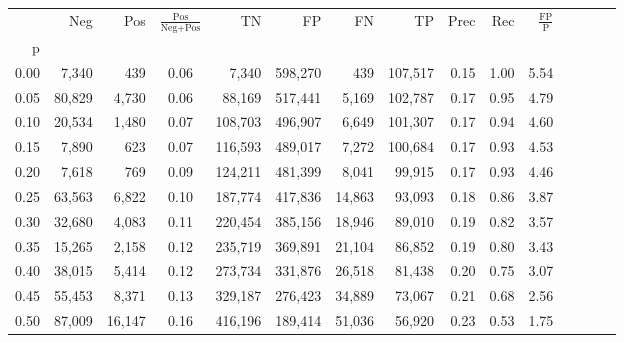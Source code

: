 \begin{tabular}{rrrcrrrrrrrrrrr}
\toprule
{} &     Neg &     Pos & $\frac{\text{Pos}}{\text{Neg}+\text{Pos}}$ &       TN &       FP &       FN &       TP &  Prec &   Rec & $\frac{\text{FP}}{\text{P}}$ \\
p    &         &         &                                            &          &          &          &          &       &       &                              \\
\midrule
0.00 &   7,340 &     439 &                                       0.06 &    7,340 &  598,270 &      439 &  107,517 &  0.15 &  1.00 &                         5.54 \\
0.05 &  80,829 &   4,730 &                                       0.06 &   88,169 &  517,441 &    5,169 &  102,787 &  0.17 &  0.95 &                         4.79 \\
0.10 &  20,534 &   1,480 &                                       0.07 &  108,703 &  496,907 &    6,649 &  101,307 &  0.17 &  0.94 &                         4.60 \\
0.15 &   7,890 &     623 &                                       0.07 &  116,593 &  489,017 &    7,272 &  100,684 &  0.17 &  0.93 &                         4.53 \\
0.20 &   7,618 &     769 &                                       0.09 &  124,211 &  481,399 &    8,041 &   99,915 &  0.17 &  0.93 &                         4.46 \\
0.25 &  63,563 &   6,822 &                                       0.10 &  187,774 &  417,836 &   14,863 &   93,093 &  0.18 &  0.86 &                         3.87 \\
0.30 &  32,680 &   4,083 &                                       0.11 &  220,454 &  385,156 &   18,946 &   89,010 &  0.19 &  0.82 &                         3.57 \\
0.35 &  15,265 &   2,158 &                                       0.12 &  235,719 &  369,891 &   21,104 &   86,852 &  0.19 &  0.80 &                         3.43 \\
0.40 &  38,015 &   5,414 &                                       0.12 &  273,734 &  331,876 &   26,518 &   81,438 &  0.20 &  0.75 &                         3.07 \\
0.45 &  55,453 &   8,371 &                                       0.13 &  329,187 &  276,423 &   34,889 &   73,067 &  0.21 &  0.68 &                         2.56 \\
0.50 &  87,009 &  16,147 &                                       0.16 &  416,196 &  189,414 &   51,036 &   56,920 &  0.23 &  0.53 &                         1.75 \\

\end{tabular}
